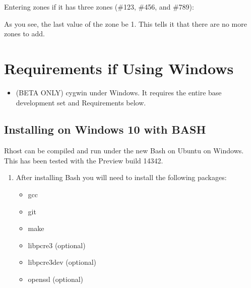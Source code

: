 \documentclass[letterpaper,10pt,english]{sphinxmanual}
\begin{document}
\sphinxAtStartPar
Entering zones if it has three zones (\#123, \#456, and \#789):

\begin{sphinxVerbatim}[commandchars=\\\{\}]
\end{sphinxVerbatim}

\sphinxAtStartPar
As you see, the last value of the zone  be \sphinxhyphen{}1.  This tells it
that there are no more zones to add.


\chapter{Requirements if Using Windows}
\label{\detokenize{windows:requirements-if-using-windows}}\label{\detokenize{windows:windows-requirements}}\label{\detokenize{windows::doc}}\begin{itemize}
\item {} 
\sphinxAtStartPar
(BETA ONLY) cygwin under Windows.  It requires the entire base development set and Requirements below.

\end{itemize}


\section{Installing on Windows 10 with BASH}
\label{\detokenize{windows:installing-on-windows-10-with-bash}}
\sphinxAtStartPar
Rhost can be compiled and run under the new Bash on Ubuntu on Windows.
This has been tested with the Preview build 14342.
\begin{enumerate}
%
\item {} 
\sphinxAtStartPar
After installing Bash you will need to install the following packages:
\begin{itemize}
\item {} 
\sphinxAtStartPar
gcc

\item {} 
\sphinxAtStartPar
git

\item {} 
\sphinxAtStartPar
make

\item {} 
\sphinxAtStartPar
libpcre3 (optional)

\item {} 
\sphinxAtStartPar
libpcre3\sphinxhyphen{}dev (optional)

\item {} 
\sphinxAtStartPar
openssl (optional)

\end{itemize}

\end{enumerate}
\end{document}
